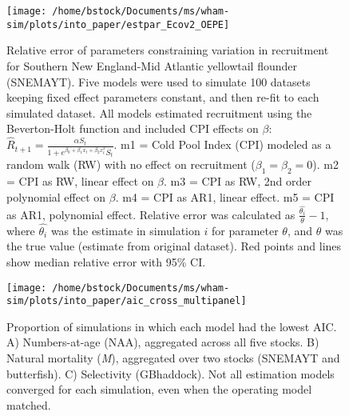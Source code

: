 \documentclass[]{article}
\begin{document}
\begin{landscape}
\begin{figure}

{\centering \texttt{[image: /home/bstock/Documents/ms/wham-sim/plots/into\_paper/estpar\_Ecov2\_OEPE]} 

}

\caption{Relative error of parameters constraining variation in recruitment for Southern New England-Mid Atlantic yellowtail flounder (SNEMAYT). Five models were used to simulate 100 datasets keeping fixed effect parameters constant, and then re-fit to each simulated dataset. All models estimated recruitment using the Beverton-Holt function and included CPI effects on $\beta$: $\hat{R}_{t+1} = \frac{\alpha S_{t}}{1 + e^{\beta_0 + \beta_1 x_{t} + \beta_2 x^2_{t}} S_t}$. m1 = Cold Pool Index (CPI) modeled as a random walk (RW) with no effect on recruitment ($\beta_1 = \beta_2 = 0$). m2 = CPI as RW, linear effect on $\beta$. m3 = CPI as RW, 2nd order polynomial effect on $\beta$. m4 = CPI as AR1, linear effect. m5 = CPI as AR1, polynomial effect. Relative error was calculated as $\frac{\hat{\theta_i}}{\theta} - 1$, where $\hat{\theta_i}$ was the estimate in simulation $i$ for parameter $\theta$, and $\theta$ was the true value (estimate from original dataset). Red points and lines show median relative error with 95\% CI.}\label{fig:estpar-ecov}
\end{figure}
\end{landscape}

\pagebreak

\begin{figure}

{\centering \texttt{[image: /home/bstock/Documents/ms/wham-sim/plots/into\_paper/aic\_cross\_multipanel]} 

}

\caption{Proportion of simulations in which each model had the lowest AIC. A) Numbers-at-age (NAA), aggregated across all five stocks. B) Natural mortality (\textit{M}), aggregated over two stocks (SNEMAYT and butterfish). C) Selectivity (GBhaddock). Not all estimation models converged for each simulation, even when the operating model matched.}\label{fig:aic-cross}
\end{figure}
\end{document}
